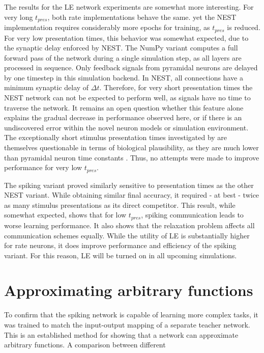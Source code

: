 The results for the LE network experiments are somewhat more interesting. For very long $t_{pres}$, both rate
implementations behave the same. yet the NEST implementation requires considerably more epochs for training, as
$t_{pres}$ is reduced. For very low presentation times, this behavior was somewhat expected, due to the synaptic delay
enforced by NEST. The NumPy variant computes a full forward pass of the network during a single simulation step, as all
layers are processed in sequence. Only feedback signals from pyramidal neurons are delayed by one timestep in this
simulation backend. In NEST, all connections have a minimum synaptic delay of $\Delta t$. Therefore, for very short
presentation times the NEST network can not be expected to perform well, as signals have no time to traverse the
network. It remains an open question whether this feature alone explains the gradual decrease in performance observed
here, or if there is an undiscovered error within the novel neuron models or simulation environment. The exceptionally
short stimulus presentation times investigated by \citep{Haider2021} are themselves questionable in terms of biological
plausibility, as they are much lower than pyramidal neuron time constants \citep{McCormick1985}. Thus, no attempts were
made to improve performance for very low $t_{pres}$.

The spiking variant proved similarly sensitive to presentation times as the other NEST variant. While obtaining similar
final accuracy, it required - at best - twice as many stimulus presentations as its direct competitor. This result,
while somewhat expected, shows that for low $t_{pres}$, spiking communication leads to worse learning performance. It
also shows that the relaxation problem affects all communication schemes equally. While the utility of LE is
substantially higher for rate neurons, it does improve performance and efficiency of the spiking variant. For this
reason, LE will be turned on in all upcoming simulations.

\section{Approximating arbitrary functions}\label{sec-func-approx}

To confirm that the spiking network is capable of learning more complex tasks, it was trained to match the input-output
mapping of a separate teacher network. This is an established method for showing that a network can approximate
arbitrary functions. A comparison between different 

